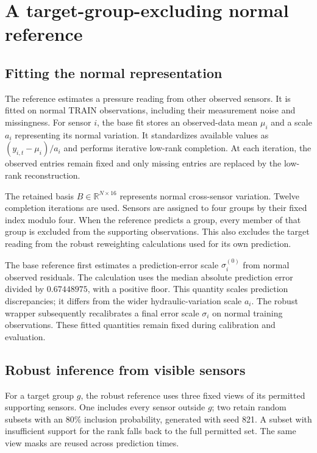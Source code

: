 \section{A target-group-excluding normal reference}
\subsection{Fitting the normal representation}
The reference estimates a pressure reading from other observed sensors. It is fitted on normal TRAIN observations, including their measurement noise and missingness. For sensor $i$, the base fit stores an observed-data mean $\mu_i$ and a scale $a_i$ representing its normal variation. It standardizes available values as $(y_{i,t}-\mu_i)/a_i$ and performs iterative low-rank completion. At each iteration, the observed entries remain fixed and only missing entries are replaced by the low-rank reconstruction.

The retained basis $B\in\mathbb R^{N\times16}$ represents normal cross-sensor variation. Twelve completion iterations are used. Sensors are assigned to four groups by their fixed index modulo four. When the reference predicts a group, every member of that group is excluded from the supporting observations. This also excludes the target reading from the robust reweighting calculations used for its own prediction.

The base reference first estimates a prediction-error scale $\sigma_i^{(0)}$ from normal observed residuals. The calculation uses the median absolute prediction error divided by $0.67448975$, with a positive floor. This quantity scales prediction discrepancies; it differs from the wider hydraulic-variation scale $a_i$. The robust wrapper subsequently recalibrates a final error scale $\sigma_i$ on normal training observations. These fitted quantities remain fixed during calibration and evaluation.

\subsection{Robust inference from visible sensors}
For a target group $g$, the robust reference uses three fixed views of its permitted supporting sensors. One includes every sensor outside $g$; two retain random subsets with an 80\% inclusion probability, generated with seed 821. A subset with insufficient support for the rank falls back to the full permitted set. The same view masks are reused across prediction times.

